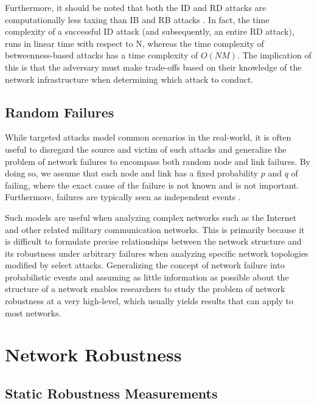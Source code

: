 \documentclass[doc]{apa}%
\begin{document}
Furthermore, it should be noted that both the ID and RD attacks are computationally less taxing than IB and RB attacks \cite{Attacks}. In fact, the time complexity of a successful ID attack (and subsequently, an entire RD attack), runs in linear time with respect to N, whereas the time complexity of betweenness-based attacks has a time complexity of $O(NM)$. The implication of this is that the adversary must make trade-offs based on their knowledge of the network infrastructure when determining which attack to conduct. 

\subsection{Random Failures}
\label{RandomFailures}
While targeted attacks model common scenarios in the real-world, it is often useful to disregard the source and victim of such attacks and generalize the problem of network failures to encompass both random node and link failures. By doing so, we assume that each node and link has a fixed probability $p$ and $q$ of failing, where the exact cause of the failure is not known and is not important. Furthermore, failures are typically seen as independent events \cite{RandomStudy}. 

Such models are useful when analyzing complex networks such as the Internet and other related military communication networks. This is primarily because it is difficult to formulate precise relationships between the network structure and its robustness under arbitrary failures when analyzing specific network topologies modified by select attacks. Generalizing the concept of network failure into probabilistic events and assuming as little information as possible about the structure of a network enables researchers to study the problem of network robustness at a very high-level, which usually yields results that can apply to most networks. 

\section{Network Robustness}

\subsection{Static Robustness Measurements}
\end{document}
